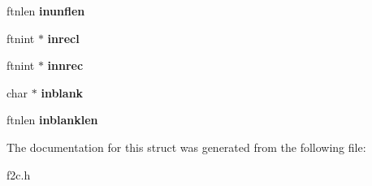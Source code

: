 \begin{DoxyCompactItemize}
\item 
\hypertarget{structinlist_a4a5e555086d129a2b8edc7d2ff3b3725}{
ftnlen {\bfseries inunflen}}
\label{structinlist_a4a5e555086d129a2b8edc7d2ff3b3725}

\item 
\hypertarget{structinlist_ad11fedcf60bcfb643548dc8992f8774c}{
ftnint $\ast$ {\bfseries inrecl}}
\label{structinlist_ad11fedcf60bcfb643548dc8992f8774c}

\item 
\hypertarget{structinlist_a0d5491f5ed82c5e4f787ac0411fd7600}{
ftnint $\ast$ {\bfseries innrec}}
\label{structinlist_a0d5491f5ed82c5e4f787ac0411fd7600}

\item 
\hypertarget{structinlist_a3cbc44275b6c1cab2d1aad14af0b3318}{
char $\ast$ {\bfseries inblank}}
\label{structinlist_a3cbc44275b6c1cab2d1aad14af0b3318}

\item 
\hypertarget{structinlist_a2aec2496017c66c3ba0d96adcb2b37a0}{
ftnlen {\bfseries inblanklen}}
\label{structinlist_a2aec2496017c66c3ba0d96adcb2b37a0}

\end{DoxyCompactItemize}


The documentation for this struct was generated from the following file:\begin{DoxyCompactItemize}
\item 
f2c.h\end{DoxyCompactItemize}
